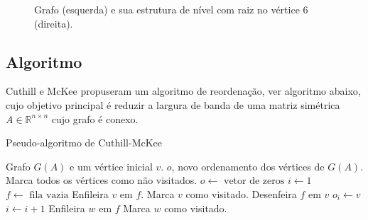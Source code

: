 \begin{figure}[htb]
    \centering
    \caption{Grafo (esquerda) e sua estrutura de nível com raiz no vértice 6
    (direita).}
    \label{fig:graph2level_struct}
\end{figure}
\subsection{Algoritmo}
Cuthill e McKee \cite{Cuthill:1969:ReducingBandwidth} propuseram um algoritmo de
reordenação, ver algoritmo abaixo, cujo objetivo principal é reduzir a largura
de banda de uma matriz simétrica $A \in \mathbb{R}^{n \times n}$ cujo grafo
é conexo.

\begin{algorithm}[H]
    \caption{Pseudo-algoritmo de Cuthill-McKee}
    \label{alg:rcm}
    \begin{algorithmic}[1]
        \REQUIRE Grafo $G(A)$ e um vértice inicial $v$.
        \ENSURE $o$, novo ordenamento dos vértices de $G(A)$.
        \STATE Marca todos os vértices como não visitados.
        \STATE $o \longleftarrow \text{ vetor de zeros}$
        \STATE $i \longleftarrow 1$
        \STATE $f \longleftarrow \text{ fila vazia}$
        \STATE Enfileira $v$ em $f$.
        \STATE Marca $v$ como visitado.
            \STATE Desenfeira $f$ em $v$
            \STATE $o_i \longleftarrow v$
            \STATE $i \longleftarrow i + 1$
                    \STATE Enfileira $w$ em $f$
                    \STATE Marca $w$ como visitado.
                \ENDIF
            \ENDFOR
        \ENDWHILE
    \end{algorithmic}
\end{algorithm}

